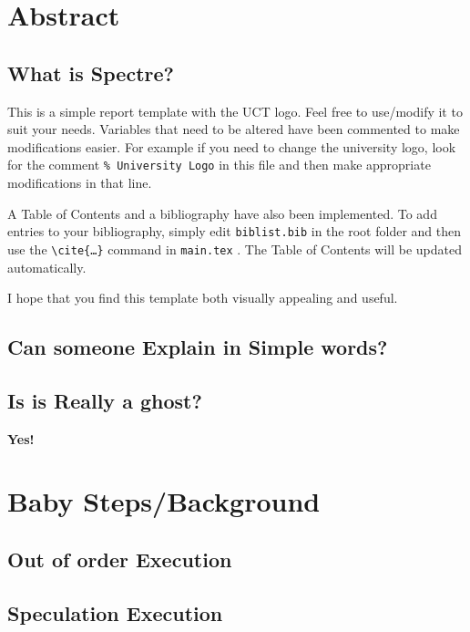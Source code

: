 \documentclass[12pt]{article}
\begin{document}

\tableofcontents
\pagebreak


\section{Abstract}
\subsection{What is Spectre?}
This is a simple report template with the UCT logo. Feel free to use/modify it to suit your needs. Variables that need to be altered have been commented to make modifications easier. For example if you need to change the university logo, look for the comment \texttt{\% University Logo} in this file and then make appropriate modifications in that line.

A Table of Contents and a bibliography have also been implemented. To add entries to your bibliography, simply edit \texttt{biblist.bib} in the root folder and then use the \texttt{\textbackslash cite\{\ldots\}} command in \texttt{main.tex} \cite{bibtex}. The Table of Contents will be updated automatically.

I hope that you find this template both visually appealing and useful. \\
\subsection{Can someone Explain in Simple words?}
\subsection{Is is Really a ghost?}
\textbf{Yes!}


\section{Baby Steps/Background}
\subsection{Out of order Execution}
\subsection{Speculation Execution}
\end{document}
